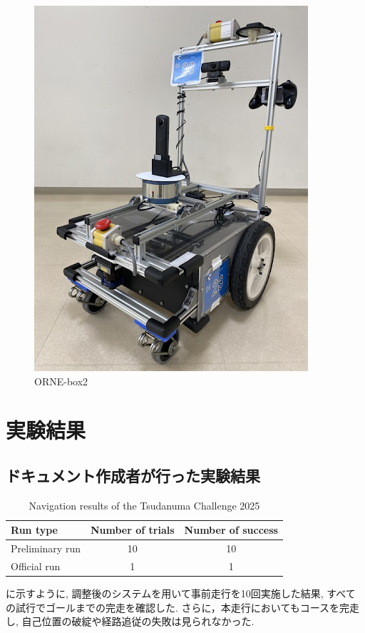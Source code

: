 \begin{figure}[hbtp]
  \centering
 \includegraphics[keepaspectratio, scale=0.3]
      {images/box2.png}
 \caption{ORNE-box2}
 \label{Fig:ORNE-box2}
\end{figure}




\newpage
\section{実験結果}
\subsection{ドキュメント作成者が行った実験結果}
\begin{table}[htbp]
  \centering
  \caption{Navigation results of the Tsudanuma Challenge 2025}
  \label{tab:tsudanuma_result}
  \begin{tabular}{lcc}
    \hline
    \textbf{Run type} & \textbf{Number of trials} & \textbf{Number of success} \\
    \hline
    Preliminary run & 10 & 10 \\
    Official run        & 1  & 1  \\
    \hline
  \end{tabular}
\end{table}
に示すように, 調整後のシステムを用いて事前走行を10回実施した結果, すべての試行でゴールまでの完走を確認した. 
さらに，本走行においてもコースを完走し, 自己位置の破綻や経路追従の失敗は見られなかった. 

